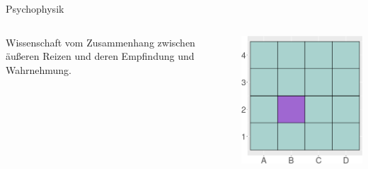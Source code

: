 \documentclass[aspectratio=169]{beamer}
\begin{document}
\begin{frame}{Psychophysik}

\begin{columns}[c]

\begin{column}{5cm}

Wissenschaft vom Zusammenhang zwischen äußeren Reizen und deren Empfindung und Wahrnehmung.


\end{column}


\begin{column}{5cm}
\begin{center}
    \includegraphics[width=\textwidth]{color_test_screenshot_3.png}
\end{center}
\end{column}


\end{columns}
    
\end{frame}
\end{document}
